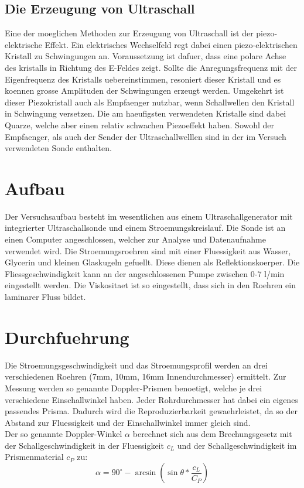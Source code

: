 \documentclass[titlepage=firstcover, captions=tableheading]{scrartcl}
\begin{document}
\subsection{Die Erzeugung von Ultraschall}
Eine der moeglichen Methoden zur Erzeugung von Ultraschall ist der piezo-elektrische Effekt. Ein elektrisches Wechselfeld regt dabei einen piezo-elektrischen Kristall zu Schwingungen an. Voraussetzung ist dafuer, dass eine polare Achse des kristalls in Richtung des E-Feldes zeigt. Sollte die Anregungsfrequenz mit der Eigenfrequenz des Kristalls uebereinstimmen, resoniert dieser Kristall und es koennen grosse Amplituden der Schwingungen erzeugt werden.
Umgekehrt ist dieser Piezokristall auch als Empfaenger nutzbar, wenn Schallwellen den Kristall in Schwingung versetzen. Die am haeufigsten verwendeten Kristalle sind dabei Quarze, welche aber einen relativ schwachen Piezoeffekt haben. Sowohl der Empfaenger, als auch der Sender der Ultraschallwelllen sind in der im Versuch verwendeten Sonde enthalten. 
\section{Aufbau}
Der Versuchsaufbau besteht im wesentlichen aus einem Ultraschallgenerator mit integrierter Ultraschallsonde und einem Stroemungskreislauf. Die Sonde ist an einen Computer angeschlossen, welcher zur Analyse und Datenaufnahme verwendet wird. Die Stroemungsroehren sind mit einer Fluessigkeit aus Wasser, Glycerin und kleinen Glaskugeln gefuellt. Diese dienen als Reflektionskoerper. Die Fliessgeschwindigkeit kann an der angeschlossenen Pumpe zwischen 0-7 l/min eingestellt werden. Die Viskositaet ist so eingestellt, dass sich in den Roehren ein laminarer Fluss bildet.
\section{Durchfuehrung}
Die Stroemungsgeschwindigkeit und das Stroemungsprofil werden an drei verschiedenen Roehren (7mm, 10mm, 16mm Innendurchmesser) ermittelt. Zur Messung werden so genannte Doppler-Prismen benoetigt, welche je drei verschiedene Einschallwinkel haben. Jeder Rohrdurchmesser hat dabei ein eigenes passendes Prisma. Dadurch wird die Reproduzierbarkeit gewaehrleistet, da so der Abstand zur Fluessigkeit und der Einschallwinkel immer gleich sind.\\
Der so genannte Doppler-Winkel $\alpha$ berechnet sich aus dem Brechungsgesetz mit der Schallgeschwindigkeit in der Fluessigkeit $c_L$ und der Schallgeschwindigkeit im Prismenmaterial $c_P$ zu:
\begin{equation}
    \alpha=90^\circ-\arcsin(\sin\theta*\frac{c_L}{C_P})
\end{equation}
\end{document}
